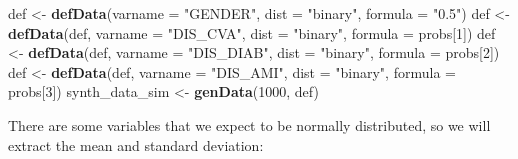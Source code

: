 \documentclass[
]{book}
\newenvironment{Shaded}{\begin{snugshade}}{\end{snugshade}}
\newcommand{\ControlFlowTok}[1]{\textcolor[rgb]{0.13,0.29,0.53}{\textbf{#1}}}
\newcommand{\DataTypeTok}[1]{\textcolor[rgb]{0.13,0.29,0.53}{#1}}
\newcommand{\DecValTok}[1]{\textcolor[rgb]{0.00,0.00,0.81}{#1}}
\newcommand{\FloatTok}[1]{\textcolor[rgb]{0.00,0.00,0.81}{#1}}
\newcommand{\KeywordTok}[1]{\textcolor[rgb]{0.13,0.29,0.53}{\textbf{#1}}}
\newcommand{\NormalTok}[1]{#1}
\newcommand{\OperatorTok}[1]{\textcolor[rgb]{0.81,0.36,0.00}{\textbf{#1}}}
\newcommand{\StringTok}[1]{\textcolor[rgb]{0.31,0.60,0.02}{#1}}
\begin{document}
\begin{Shaded}
\begin{Highlighting}[]
\NormalTok{def <-}\StringTok{ }\KeywordTok{defData}\NormalTok{(}\DataTypeTok{varname =} \StringTok{"GENDER"}\NormalTok{, }\DataTypeTok{dist =} \StringTok{"binary"}\NormalTok{, }
               \DataTypeTok{formula =} \StringTok{"0.5"}\NormalTok{)}
\NormalTok{def <-}\StringTok{ }\KeywordTok{defData}\NormalTok{(def, }\DataTypeTok{varname =} \StringTok{"DIS_CVA"}\NormalTok{, }\DataTypeTok{dist =} \StringTok{"binary"}\NormalTok{, }
               \DataTypeTok{formula =}\NormalTok{ probs[}\DecValTok{1}\NormalTok{])}
\NormalTok{def <-}\StringTok{ }\KeywordTok{defData}\NormalTok{(def, }\DataTypeTok{varname =} \StringTok{"DIS_DIAB"}\NormalTok{, }\DataTypeTok{dist =} \StringTok{"binary"}\NormalTok{, }
               \DataTypeTok{formula =}\NormalTok{ probs[}\DecValTok{2}\NormalTok{])}
\NormalTok{def <-}\StringTok{ }\KeywordTok{defData}\NormalTok{(def, }\DataTypeTok{varname =} \StringTok{"DIS_AMI"}\NormalTok{, }\DataTypeTok{dist =} \StringTok{"binary"}\NormalTok{, }
               \DataTypeTok{formula =}\NormalTok{ probs[}\DecValTok{3}\NormalTok{])}
\NormalTok{synth_data_sim <-}\StringTok{ }\KeywordTok{genData}\NormalTok{(}\DecValTok{1000}\NormalTok{, def)}
\end{Highlighting}
\end{Shaded}

There are some variables that we expect to be normally distributed, so we will extract the mean and standard deviation:

\begin{Shaded}
\end{Shaded}
\end{document}
